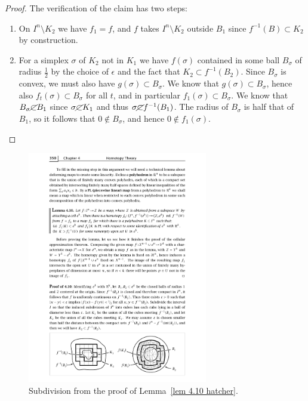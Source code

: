 \begin{proof}
    The verification of the claim has two steps:
    \begin{enumerate}[label=(\arabic*)]
        \item On $I^n\setminus K_2$ we have $f_1=f$, and $f$ takes $I^n\setminus K_2$ outside $B_1$ since $f^{-1}(B)\subset K_2$ by construction.
        \item For a simplex $\sigma$ of $K_2$ not in $K_1$ we have $f(\sigma)$ contained in some ball $B_\sigma$ of radius $\frac 12$ by the choice of $\epsilon$ and the fact that $K_2\subset f^{-1}(B_2)$. Since $B_\sigma$ is convex, we must also have $g(\sigma)\subset B_\sigma$. We know that $g(\sigma)\subset B_\sigma$, hence also $f_t(\sigma)\subset B_\sigma$ for all $t$, and in particular $f_1(\sigma)\subset B_\sigma$. We know that $B_\sigma\cancel{\subset} B_1$ since $\sigma\cancel{\subset}K_1$ and thus $\sigma\cancel{\subset}f^{-1}(B_1)$. The radius of $B_\sigma$ is half that of $B_1$, so it follows that $0\notin B_\sigma$, and hence $0\notin f_1(\sigma)$.
    \end{enumerate}
\end{proof}

\begin{figure}
    \centering
    \includegraphics[width=0.7\textwidth]{figures/cell_approx.pdf}
    \caption{Subdivision from the proof of Lemma~\ref{lem 4.10 hatcher}.}
    \label{fig:cell_approx}
\end{figure}


